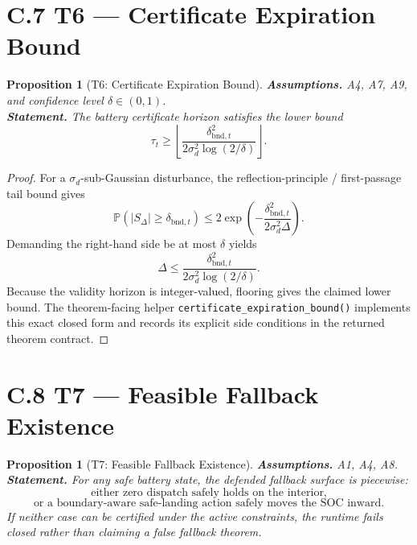 \documentclass[11pt]{article}
\newtheorem{proposition}[theorem]{Proposition}
\newcommand{\1}{\mathbf{1}}
\newcommand{\Prob}{\mathbb{P}}
\begin{document}
\section*{C.7 T6 --- Certificate Expiration Bound}

\begin{proposition}[T6: Certificate Expiration Bound]\label{thm:t6}
\textbf{Assumptions.} A4, A7, A9, and confidence level $\delta\in(0,1)$. \\
\textbf{Statement.} The battery certificate horizon satisfies the lower bound
\[
  \tau_t \ge
  \left\lfloor
    \frac{\delta_{\mathrm{bnd},t}^2}
    {2\sigma_d^2 \log(2/\delta)}
  \right\rfloor.
\]
\end{proposition}

\begin{proof}
For a $\sigma_d$-sub-Gaussian disturbance, the reflection-principle /
first-passage tail bound gives
\[
  \Prob(|S_\Delta| \ge \delta_{\mathrm{bnd},t})
  \le
  2\exp\!\left(
    -\frac{\delta_{\mathrm{bnd},t}^2}{2\sigma_d^2\Delta}
  \right).
\]
Demanding the right-hand side be at most $\delta$ yields
\[
  \Delta \le \frac{\delta_{\mathrm{bnd},t}^2}
  {2\sigma_d^2 \log(2/\delta)}.
\]
Because the validity horizon is integer-valued, flooring gives the claimed
lower bound.  The theorem-facing helper
\texttt{certificate\_expiration\_bound()} implements this exact closed form and
records its explicit side conditions in the returned theorem contract.
\qedhere
\end{proof}

\section*{C.8 T7 --- Feasible Fallback Existence}

\begin{proposition}[T7: Feasible Fallback Existence]\label{thm:t7}
\textbf{Assumptions.} A1, A4, A8. \\
\textbf{Statement.} For any safe battery state, the defended fallback surface
is piecewise:
\[
  \text{either zero dispatch safely holds on the interior,}
\]
\[
  \text{or a boundary-aware safe-landing action safely moves the SOC inward.}
\]
If neither case can be certified under the active constraints, the runtime
fails closed rather than claiming a false fallback theorem.
\end{proposition}
\end{document}

